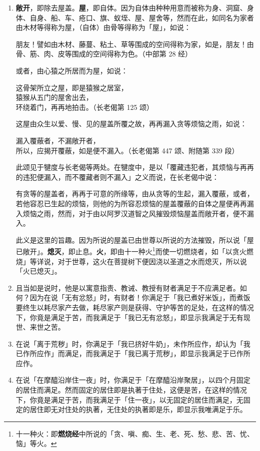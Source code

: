 \begin{enumerate}
\item \textbf{敞开}，即除去屋盖。\textbf{屋}，即自体。因为自体由种种用意而被称为身、洞窟、身体、自身、船、车、疮口、旗、蚁垤、屋、屋舍等，然而在此，如同名为家者由木材等得称为屋，（自体）由骨等得称为「屋」，如说：\begin{quoting}朋友！譬如由木材、藤蔓、粘土、草等围成的空间得称为家，如是，朋友！由骨、筋、肉、皮等围成的空间得称为色。（中部第 28 经）\end{quoting}或者，由心猿之所居而为屋，如说：\begin{quoting}这骨架所立之屋，即是猿猴之居室，\\猿猴从五门的屋舍出去，\\环绕着门，再再地拍击。（长老偈第 125 颂）\end{quoting}这屋由众生以爱、慢、见的屋盖所覆之故，再再漏入贪等烦恼之雨，如说：\begin{quoting}漏入覆蔽者，不漏敞开者，\\所以，应揭开覆蔽，如是便不漏入。（长老偈第 447 颂、附随第 339 段）\end{quoting}此颂见于犍度与长老偈等两处。在犍度中，是以「覆藏违犯者，其烦恼与再再的违犯便漏入，而不覆藏者则不漏入」之义而说，在长老偈中说：\begin{quoting}有贪等的屋盖者，再再于可意的所缘等，由从贪等的生起，漏入覆蔽，或者，若他容忍已生起的烦恼，则他的为所容忍烦恼的屋盖覆蔽的自体之屋便再再漏入烦恼之雨，然而，对于由以阿罗汉道智之风摧毁烦恼屋盖而敞开者，便不漏入。\end{quoting}此义是这里的旨趣。因为所说的屋盖已由世尊以所说的方法摧毁，所以说「屋已敞开」。\textbf{熄灭}，即止息。\textbf{火}，即由十一种火\footnote{十一种火：即\textbf{燃烧经}中所说的「贪、嗔、痴、生、老、死、愁、悲、苦、忧、恼」等火。}而使一切燃烧者，如「以贪火燃烧」等详说，对于世尊，这火在菩提树下便因浇以圣道之水而熄灭，所以说「火已熄灭」。
\item 且当如是说时，他是以寓意指责、教诫、教授有财者满足于不应满足者。如何？因为在说「无有忿怒」时，有财者！你满足于「我已煮好米饭」，而煮饭要终生以耗尽家产去做，耗尽家产则是获得、守护等苦的足处，在这样的情况下，你竟是满足于苦，而我满足于「我已无有忿怒」，即显示我满足于无有现世、来世之苦。
\item 在说「离于荒秽」时，你满足于「我已挤好牛奶」，未作所应作，却认为「我已作所应作」而满足，而我满足于「我已离于荒秽」，即显示我满足于已作所应作。
\item 在说「在摩醯沿岸住一夜」时，你满足于「在摩醯沿岸聚居」，以四个月固定的居住而满足。然而固定的居住即是执著于住处，这便是苦，在这样的情况下，你竟是满足于苦，而我满足于「住一夜」，以无固定的居住而满足，无固定的居住即无对住处的执著，无住处的执著即是乐，即显示我唯满足于乐。

\end{enumerate}
